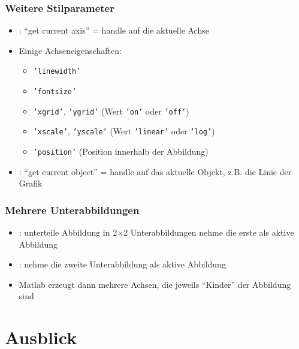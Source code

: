       \begin{frame}
          \frametitle{Weitere Stilparameter}
          \begin{itemize}
              \item {}: ``get current axis'' = handle auf die aktuelle Achse
              \item Einige Achseneigenschaften:
              \begin{itemize}
                  \item \texttt{'linewidth'}
                  \item \texttt{'fontsize'}
                  \item \texttt{'xgrid'}, \texttt{'ygrid'} (Wert \texttt{'on'} oder \texttt{'off'})
                  \item \texttt{'xscale'}, \texttt{'yscale'} (Wert \texttt{'linear'} oder \texttt{'log'})
                  \item \texttt{'position'} (Position innerhalb der Abbildung)
              \end{itemize}
              \item {}: ``get current object'' = handle auf das aktuelle Objekt, z.B. die Linie der Grafik
          \end{itemize}
      \end{frame}

      \begin{frame}
          \frametitle{Mehrere Unterabbildungen}
          \begin{itemize}
              \item {}: unterteile Abbildung in 2$\times$2 Unterabbildungen nehme die erste als aktive Abbildung
              \item {}: nehme die zweite Unterabbildung als aktive Abbildung
              \item Matlab erzeugt dann mehrere Achsen, die jeweils ``Kinder'' der Abbildung sind
          \end{itemize}
      \end{frame}

      \section{Ausblick}
